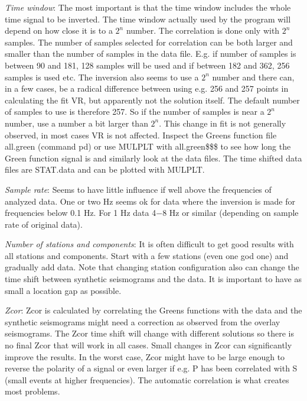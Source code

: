 \textit{Time window}: The most important is that the time window includes the whole time signal to be inverted. The time window actually used by the program will depend on how close it is to a $2^n$ number. \newline
The correlation is done only with $2^n$ samples. The number of samples selected for correlation can be both larger and smaller than the number of samples in the data file. E.g. if number of samples is between 90 and 181, 128 samples will be used and if between 182 and 362, 256 samples is used etc.\newline
The inversion also seems to use a $2^n$ number and there can, in a few cases, be a radical difference between using e.g. 256 and 257 points in calculating the fit VR, but apparently not the solution itself. The default number of samples to use is therefore 257.   So if the number of samples is near a $2^n$ number, use a number a bit larger than $2^n$. This change in fit is not generally observed, in most cases VR is not affected.\newline
Inspect the Greens function file all.green (command pd) or use MULPLT with all.green\$\$\$ to see how long the Green function signal is and similarly look at the data files. The time shifted data files are STAT.data and can be plotted with MULPLT.

\textit{Sample rate}: Seems to have little influence if well above the frequencies of analyzed data. One or two Hz seems ok for data where the inversion is made for frequencies below 0.1 Hz. For 1 Hz data 4$-$8 Hz or similar (depending on sample rate of original data).

\textit{Number of stations and components}: It is often difficult to get good results with all stations and components. Start with a few stations (even one god one) and gradually add data. Note that changing station configuration also can change the time shift between synthetic seismograms and the data. It is important to have as small a location gap as possible.

\textit{Zcor}: Zcor is calculated by correlating the Greens functions with the data and the synthetic seismograms might need a correction as observed from the overlay seismograms. The Zcor time shift will change with different solutions so there is no final Zcor that will work in all cases. Small changes in Zcor can significantly improve the results. In the worst case, Zcor might have to be large enough to reverse the polarity of a signal or even larger if e.g. P has been correlated with S (small events at higher frequencies). The automatic correlation is what creates most problems. 

